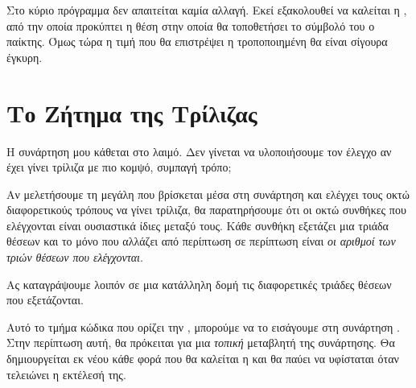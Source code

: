 \documentclass[a4paper,11pt,oneside]{book}
\begin{document}
Στο κύριο πρόγραμμα δεν απαιτείται καμία αλλαγή. Εκεί εξακολουθεί να καλείται η , από την οποία προκύπτει η θέση στην οποία θα τοποθετήσει το σύμβολό του ο παίκτης. Όμως τώρα η τιμή που θα επιστρέψει η τροποποιημένη  θα είναι σίγουρα έγκυρη.

\section{Το Ζήτημα της Τρίλιζας}

\begin{question}
Η συνάρτηση  μου κάθεται στο λαιμό. Δεν γίνεται να υλοποιήσουμε τον έλεγχο αν έχει γίνει τρίλιζα με πιο κομψό, συμπαγή τρόπο;
\end{question}

Αν μελετήσουμε τη μεγάλη  που βρίσκεται μέσα στη συνάρτηση  και ελέγχει τους οκτώ διαφορετικούς τρόπους να γίνει τρίλιζα, θα παρατηρήσουμε ότι οι οκτώ συνθήκες που ελέγχονται είναι ουσιαστικά ίδιες μεταξύ τους. Κάθε συνθήκη εξετάζει μια τριάδα θέσεων και το μόνο που αλλάζει από περίπτωση σε περίπτωση είναι \emph{οι αριθμοί των τριών θέσεων που ελέγχονται}.

Ας καταγράψουμε λοιπόν σε μια κατάλληλη δομή τις διαφορετικές τριάδες θέσεων που εξετάζονται.


Αυτό το τμήμα κώδικα που ορίζει την , μπορούμε να το εισάγουμε στη συνάρτηση . Στην περίπτωση αυτή, θα πρόκειται για μια \emph{τοπική} μεταβλητή της συνάρτησης. Θα δημιουργείται εκ νέου κάθε φορά που θα καλείται η  και θα παύει να υφίσταται όταν τελειώνει η εκτέλεσή της. 
\end{document}
